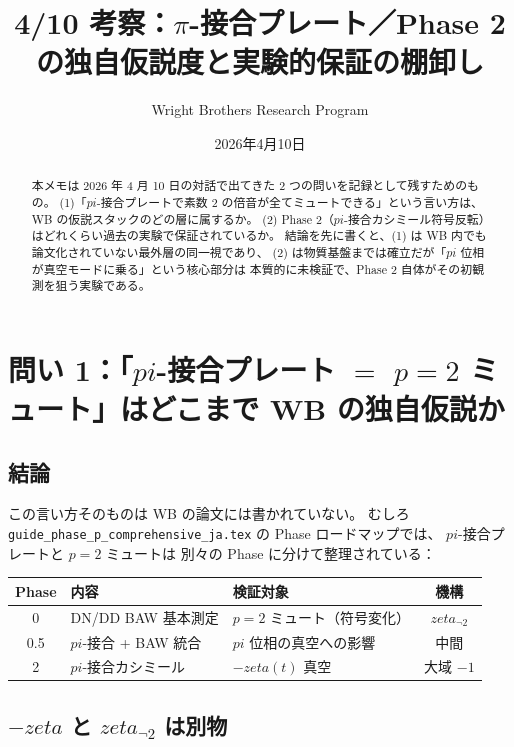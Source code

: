 \documentclass[11pt,a4paper]{article}
\title{4/10 考察：$\pi$-接合プレート／Phase 2 の独自仮説度と実験的保証の棚卸し}
\author{Wright Brothers Research Program}
\date{2026年4月10日}
\def\pi{pi}%
\def\zeta{zeta}%
\def\textbf#1{#1}%
\begin{document}
\maketitle

\begin{abstract}
本メモは 2026 年 4 月 10 日の対話で出てきた 2 つの問いを記録として残すためのもの。
(1)「$\pi$-接合プレートで素数 2 の倍音が全てミュートできる」という言い方は、
WB の仮説スタックのどの層に属するか。
(2) Phase 2（$\pi$-接合カシミール符号反転）はどれくらい過去の実験で保証されているか。
結論を先に書くと、(1) は WB 内でも論文化されていない最外層の同一視であり、
(2) は物質基盤までは確立だが「$\pi$ 位相が真空モードに乗る」という核心部分は
本質的に未検証で、Phase 2 自体がその初観測を狙う実験である。
\end{abstract}

\tableofcontents
\newpage

\section{問い 1：「$\pi$-接合プレート $=$ $p=2$ ミュート」はどこまで WB の独自仮説か}

\subsection{結論}

この言い方そのものは \textbf{WB の論文には書かれていない}。
むしろ \texttt{guide\_phase\_p\_comprehensive\_ja.tex} の Phase ロードマップでは、
$\pi$-接合プレートと $p=2$ ミュートは \textbf{別々の Phase} に分けて整理されている：

\begin{center}
\begin{tabular}{cllc}
\toprule
Phase & 内容 & 検証対象 & 機構 \\
\midrule
0   & DN/DD BAW 基本測定         & $p=2$ ミュート（符号変化） & $\zeta_{\neg 2}$ \\
0.5 & $\pi$-接合 + BAW 統合      & $\pi$ 位相の真空への影響     & 中間 \\
2   & $\pi$-接合カシミール       & $-\zeta(t)$ 真空              & 大域 $-1$ \\
\bottomrule
\end{tabular}
\end{center}

\subsection{$-\zeta$ と $\zeta_{\neg 2}$ は別物}
\end{document}
